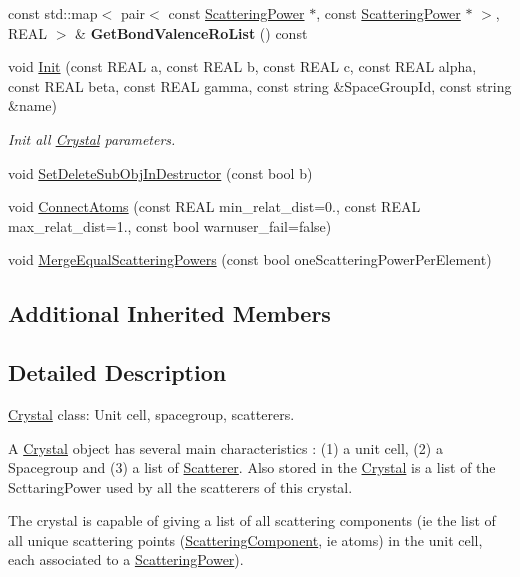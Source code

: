 \begin{DoxyCompactItemize}
const std\+::map$<$ pair$<$ const \mbox{\hyperlink{class_obj_cryst_1_1_scattering_power}{Scattering\+Power}} $\ast$, const \mbox{\hyperlink{class_obj_cryst_1_1_scattering_power}{Scattering\+Power}} $\ast$ $>$, R\+E\+AL $>$ \& {\bfseries Get\+Bond\+Valence\+Ro\+List} () const
\item 
void \mbox{\hyperlink{class_obj_cryst_1_1_crystal_aefcd0d1032e5b93de47b4b93d530ed5b}{Init}} (const R\+E\+AL a, const R\+E\+AL b, const R\+E\+AL c, const R\+E\+AL alpha, const R\+E\+AL beta, const R\+E\+AL gamma, const string \&Space\+Group\+Id, const string \&name)
\begin{DoxyCompactList}\small\item\em Init all \mbox{\hyperlink{class_obj_cryst_1_1_crystal}{Crystal}} parameters. \end{DoxyCompactList}\item 
void \mbox{\hyperlink{class_obj_cryst_1_1_crystal_ae976f94ba642aa81cb7b23fcc1a56028}{Set\+Delete\+Sub\+Obj\+In\+Destructor}} (const bool b)
\item 
void \mbox{\hyperlink{class_obj_cryst_1_1_crystal_a6e7bc69bcb5331e8faf60ef13db1255c}{Connect\+Atoms}} (const R\+E\+AL min\+\_\+relat\+\_\+dist=0., const R\+E\+AL max\+\_\+relat\+\_\+dist=1., const bool warnuser\+\_\+fail=false)
\item 
void \mbox{\hyperlink{class_obj_cryst_1_1_crystal_a8cf8ddfad602c6662dd57c8680ad6a67}{Merge\+Equal\+Scattering\+Powers}} (const bool one\+Scattering\+Power\+Per\+Element)
\end{DoxyCompactItemize}
\subsection*{Additional Inherited Members}


\subsection{Detailed Description}
\mbox{\hyperlink{class_obj_cryst_1_1_crystal}{Crystal}} class\+: Unit cell, spacegroup, scatterers. 

A \mbox{\hyperlink{class_obj_cryst_1_1_crystal}{Crystal}} object has several main characteristics \+: (1) a unit cell, (2) a Spacegroup and (3) a list of \mbox{\hyperlink{class_obj_cryst_1_1_scatterer}{Scatterer}}. Also stored in the \mbox{\hyperlink{class_obj_cryst_1_1_crystal}{Crystal}} is a list of the Scttaring\+Power used by all the scatterers of this crystal.

The crystal is capable of giving a list of all scattering components (ie the list of all unique scattering \textquotesingle{}points\textquotesingle{} (\mbox{\hyperlink{struct_obj_cryst_1_1_scattering_component}{Scattering\+Component}}, ie atoms) in the unit cell, each associated to a \mbox{\hyperlink{class_obj_cryst_1_1_scattering_power}{Scattering\+Power}}).

